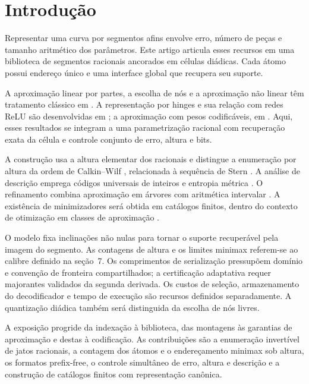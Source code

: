 \section{Introdução}
Representar uma curva por segmentos afins envolve erro, número de peças e tamanho aritmético dos parâmetros. Este artigo articula esses recursos em uma biblioteca de segmentos racionais ancorados em células diádicas. Cada átomo possui endereço único e uma interface global que recupera seu suporte.

A aproximação linear por partes, a escolha de nós e a aproximação não linear têm tratamento clássico em \citet{deboor1973,burchard1974,deboor2001,powell1981,schumaker2007,devore1998}. A representação por hinges e sua relação com redes ReLU são desenvolvidas em \citet{yarotsky2017,devore2021,daubechies2022}; a aproximação com pesos codificáveis, em \citet{petersen2018,elbrachter2021,bolcskei2019,guhring2021}. Aqui, esses resultados se integram a uma parametrização racional com recuperação exata da célula e controle conjunto de erro, altura e bits.

A construção usa a altura elementar dos racionais \citep{bombieri2006} e distingue a enumeração por altura da ordem de Calkin--Wilf \citep{calkin2000}, relacionada à sequência de Stern \citep{stern1858,northshield2010}. A análise de descrição emprega códigos universais de inteiros \citep{elias1975,cover2006} e entropia métrica \citep{kolmogorov1959,kolmogorov1961,lorentz1996}. O refinamento combina aproximação em árvores \citep{cohen2001,binev2004,kessebohmer2025} com aritmética intervalar \citep{moore2009,silva2025}. A existência de minimizadores será obtida em catálogos finitos, dentro do contexto de otimização em classes de aproximação \citep{christof2021}.

O modelo fixa inclinações não nulas para tornar o suporte recuperável pela imagem do segmento. As contagens de altura e os limites minimax referem-se ao calibre definido na seção~7. Os comprimentos de serialização pressupõem domínio e convenção de fronteira compartilhados; a certificação adaptativa requer majorantes validados da segunda derivada. Os custos de seleção, armazenamento do decodificador e tempo de execução são recursos definidos separadamente. A quantização diádica também será distinguida da escolha de nós livres.

A exposição progride da indexação à biblioteca, das montagens às garantias de aproximação e destas à codificação. As contribuições são a enumeração invertível de jatos racionais, a contagem dos átomos e o endereçamento minimax sob altura, os formatos prefix-free, o controle simultâneo de erro, altura e descrição e a construção de catálogos finitos com representação canônica.

